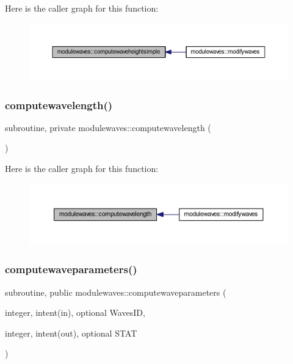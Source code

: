 Here is the caller graph for this function\+:\nopagebreak
\begin{figure}[H]
\begin{center}
\leavevmode
\includegraphics[width=350pt]{namespacemodulewaves_af86c07d276fd3f5fe89a2adc94d0518f_icgraph}
\end{center}
\end{figure}
\mbox{\label{namespacemodulewaves_acea107970c1ba41962a9affab7ff313a}} 
\subsubsection{\texorpdfstring{computewavelength()}{computewavelength()}}
{\footnotesize\ttfamily subroutine, private modulewaves\+::computewavelength (\begin{DoxyParamCaption}{ }\end{DoxyParamCaption})\hspace{0.3cm}{\ttfamily [private]}}

Here is the caller graph for this function\+:\nopagebreak
\begin{figure}[H]
\begin{center}
\leavevmode
\includegraphics[width=350pt]{namespacemodulewaves_acea107970c1ba41962a9affab7ff313a_icgraph}
\end{center}
\end{figure}
\mbox{\label{namespacemodulewaves_a6a63e2ee3bdd7ee4378a33408a4668a7}} 
\subsubsection{\texorpdfstring{computewaveparameters()}{computewaveparameters()}}
{\footnotesize\ttfamily subroutine, public modulewaves\+::computewaveparameters (\begin{DoxyParamCaption}\item[{integer, intent(in), optional}]{Waves\+ID,  }\item[{integer, intent(out), optional}]{S\+T\+AT }\end{DoxyParamCaption})}

